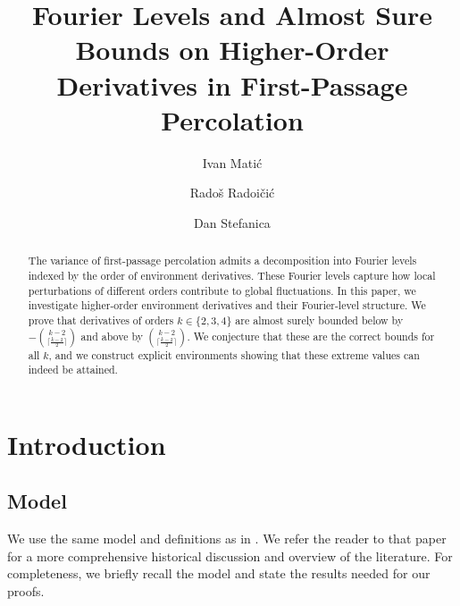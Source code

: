 \documentclass[reqno]{amsart}
\begin{document}
 
 

\title[Fourier Levels and Almost Sure Bounds]{Fourier Levels and Almost Sure Bounds on Higher-Order Derivatives in First-Passage Percolation} 

\author[I. Mati\'c]{
Ivan Mati\'c}
\address{
Baruch College, City University of New York}
\author[R. Radoi\v ci\'c]{
Rado\v s Radoi\v ci\'c} \address{
Baruch College, City University of New York} 
\author[D. Stefanica]{
Dan Stefanica}\address{
Baruch College, City University of New York}


\maketitle
 

 

\begin{abstract}
The variance of first-passage percolation admits a decomposition into Fourier levels indexed by the order of environment derivatives. These Fourier levels capture how local perturbations of different orders contribute to global fluctuations. In this paper, we investigate higher-order environment derivatives and their Fourier-level structure. We prove that derivatives of orders \(k\in\{2,3,4\}\) are almost surely bounded below by \(-\binom{k-2}{\lceil\frac{k-2}2\rceil}\) and above by \(\binom{k-2}{\lceil\frac{k-2}2\rceil}\). We conjecture that these are the correct bounds for all \(k\), and we construct explicit environments showing that these extreme values can indeed be attained.
\end{abstract}



   
 
 

\section{Introduction}

 
\subsection{Model}

We use the same model and definitions as in \cite{FirstPaper2025}. We refer the reader to that paper for a more comprehensive historical discussion and overview of the literature. For completeness, we briefly recall the model and state the results needed for our proofs.
\end{document}
